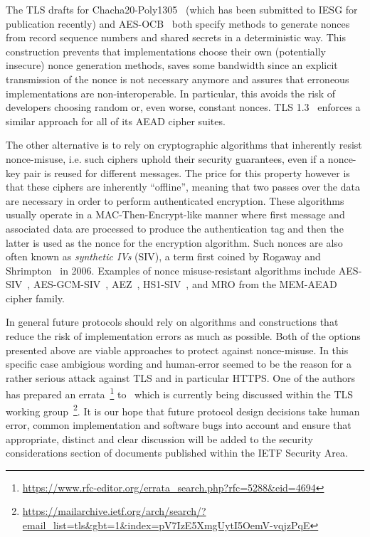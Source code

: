 \documentclass[10pt, a4paper]{article}
\begin{document}
The TLS drafts for Chacha20-Poly1305~\cite{draft-chacha-langely} (which has been submitted to IESG for publication recently) and AES-OCB~\cite{draft-ocb-zauner} both specify methods to generate nonces
from record sequence numbers and shared secrets in a deterministic way.
This construction prevents that implementations choose their own (potentially insecure) nonce generation methods, saves some bandwidth since an explicit transmission of the nonce
is not necessary anymore and assures that erroneous implementations are non-interoperable. In particular, this avoids the risk of developers choosing random or, even worse, constant nonces.
TLS 1.3~\cite{draft-tls13-rescorla} enforces a similar approach for all of its AEAD cipher suites. 


The other alternative is to rely on cryptographic algorithms that inherently resist nonce-misuse, i.e.
such ciphers uphold their security guarantees, even if a nonce-key pair is reused for different messages.
The price for this property however is that these ciphers are inherently ``offline'',
meaning that two passes over the data are necessary in order to perform authenticated encryption.
These algorithms usually operate in a MAC-Then-Encrypt-like manner where
first message and associated data are processed to produce the authentication tag and then the latter is used as the nonce for the encryption algorithm.
Such nonces are also often known as \emph{synthetic IVs} (SIV), a term first coined by Rogaway and Shrimpton~\cite{EPRINT:RogShr06} in 2006.
Examples of nonce misuse-resistant algorithms include AES-SIV~\cite{rfc5297}, AES-GCM-SIV~\cite{gcm-siv}, AEZ~\cite{EC:HoaKroRog15}, HS1-SIV~\cite{HS1SIV14}, and MRO from the MEM-AEAD~\cite{granger2016} cipher family.

In general future protocols should rely on algorithms and constructions that reduce the risk of implementation errors as much as possible.
Both of the options presented above are viable approaches to protect against nonce-misuse. In this specific case ambigious wording and human-error seemed to be the reason
for a rather serious attack against TLS and in particular HTTPS. One of the authors has prepared an errata~\footnote{\url{https://www.rfc-editor.org/errata_search.php?rfc=5288&eid=4694}} to~\cite{RFC5288} which is currently being discussed within the TLS working group~\footnote{\url{https://mailarchive.ietf.org/arch/search/?email_list=tls&gbt=1&index=pV7IzE5XmgUytI5OemV-vqjzPqE}}.
It is our hope that future protocol design decisions take human error, common implementation and software bugs into account and ensure that appropriate, distinct and clear discussion will be added
to the security considerations section of documents published within the IETF Security Area.
\end{document}
